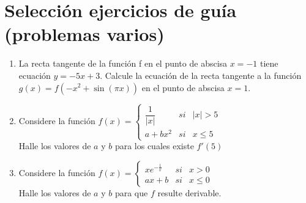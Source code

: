 \documentclass[12pt]{article}
\begin{document}
\section{Selección ejercicios de guía (problemas varios)}
\begin{enumerate}
    \item La recta tangente de la función f en el punto de abscisa $x=-1$ tiene ecuación $y=-5x+3$. 
    Calcule la ecuación de la recta tangente a la función $g(x)=f(-x^2+\sin (\pi x))$ en el punto de abscisa $x=1$.

    \item Considere la función $\displaystyle f(x)=\left\{\begin{array}{ccr}
    \dfrac{1}{|x|} & si &  |x| > 5 \\[10pt]
     a+bx^2 & si & x \leq 5
    \end{array}\right.$\\[6pt]
    Halle los valores de $a$ y $b$ para los cuales existe $f'(5)$

    \vspace{0.5cm}
    \item Considere la función $\displaystyle f(x)=\left\{\begin{array}{ccr}
    xe^{-\frac{1}{x}} & si &  x > 0 \\[10pt]
     ax+b & si & x \leq 0 
    \end{array}\right.$\\[6pt] 
    Halle los valores de $a$ y $b$ para que $f$ resulte derivable.
\end{enumerate}
\end{document}
